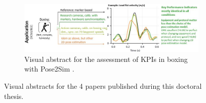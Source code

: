 \begin{figure}[hbtp]
      \vskip 1cm
	\begin{subfigure}[b]{1\textwidth}
            \centering
            \def\svgwidth{1\columnwidth}
            \fontsize{10pt}{10pt}\selectfont
            \includegraphics[width=\linewidth]{"../Intro/Figures/Fig_VisAbstract4.JPG"}
            \caption{Visual abstract for the assessment of KPIs in boxing with Pose2Sim \cite{Pagnon2022c}.}
            \label{fig_visabstract4_1}
	\end{subfigure}
	\caption{Visual abstracts for the 4 papers published during this doctoral thesis.}
	\label{fig_visabstract}
\end{figure}


